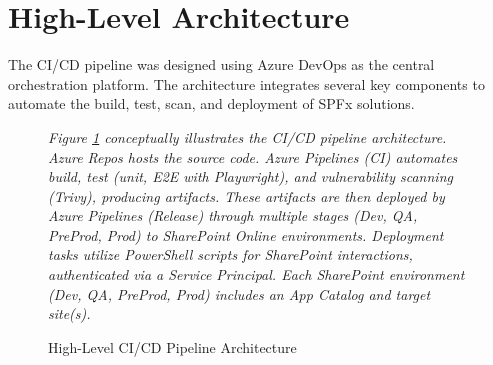 \section{High-Level Architecture}
\label{sec:HighLevelArchitecture}

The CI/CD pipeline was designed using Azure DevOps as the central orchestration platform. The architecture integrates several key components to automate the build, test, scan, and deployment of SPFx solutions.

\begin{figure}[htbp]
    \centering
    \parbox{0.8\textwidth}{
        \centering
        \textit{Figure \ref{fig:HighLevelArchitecture} conceptually illustrates the CI/CD pipeline architecture.
        Azure Repos hosts the source code. Azure Pipelines (CI) automates build, test (unit, E2E with Playwright), and vulnerability scanning (Trivy), producing artifacts.
        These artifacts are then deployed by Azure Pipelines (Release) through multiple stages (Dev, QA, PreProd, Prod) to SharePoint Online environments.
        Deployment tasks utilize PowerShell scripts for SharePoint interactions, authenticated via a Service Principal.
        Each SharePoint environment (Dev, QA, PreProd, Prod) includes an App Catalog and target site(s).}
    }
    \caption{High-Level CI/CD Pipeline Architecture}
    \label{fig:HighLevelArchitecture}
\end{figure}

